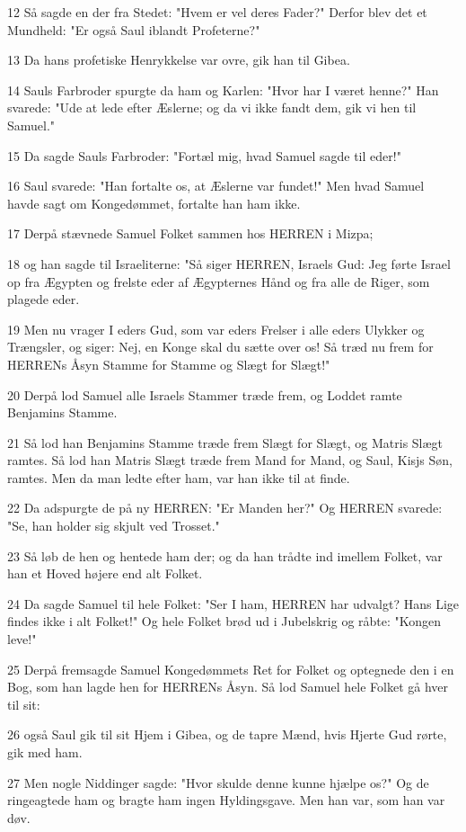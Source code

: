 \par 12 Så sagde en der fra Stedet: "Hvem er vel deres Fader?" Derfor blev det et Mundheld: "Er også Saul iblandt Profeterne?"
\par 13 Da hans profetiske Henrykkelse var ovre, gik han til Gibea.
\par 14 Sauls Farbroder spurgte da ham og Karlen: "Hvor har I været henne?" Han svarede: "Ude at lede efter Æslerne; og da vi ikke fandt dem, gik vi hen til Samuel."
\par 15 Da sagde Sauls Farbroder: "Fortæl mig, hvad Samuel sagde til eder!"
\par 16 Saul svarede: "Han fortalte os, at Æslerne var fundet!" Men hvad Samuel havde sagt om Kongedømmet, fortalte han ham ikke.
\par 17 Derpå stævnede Samuel Folket sammen hos HERREN i Mizpa;
\par 18 og han sagde til Israeliterne: "Så siger HERREN, Israels Gud: Jeg førte Israel op fra Ægypten og frelste eder af Ægypternes Hånd og fra alle de Riger, som plagede eder.
\par 19 Men nu vrager I eders Gud, som var eders Frelser i alle eders Ulykker og Trængsler, og siger: Nej, en Konge skal du sætte over os! Så træd nu frem for HERRENs Åsyn Stamme for Stamme og Slægt for Slægt!"
\par 20 Derpå lod Samuel alle Israels Stammer træde frem, og Loddet ramte Benjamins Stamme.
\par 21 Så lod han Benjamins Stamme træde frem Slægt for Slægt, og Matris Slægt ramtes. Så lod han Matris Slægt træde frem Mand for Mand, og Saul, Kisjs Søn, ramtes. Men da man ledte efter ham, var han ikke til at finde.
\par 22 Da adspurgte de på ny HERREN: "Er Manden her?" Og HERREN svarede: "Se, han holder sig skjult ved Trosset."
\par 23 Så løb de hen og hentede ham der; og da han trådte ind imellem Folket, var han et Hoved højere end alt Folket.
\par 24 Da sagde Samuel til hele Folket: "Ser I ham, HERREN har udvalgt? Hans Lige findes ikke i alt Folket!" Og hele Folket brød ud i Jubelskrig og råbte: "Kongen leve!"
\par 25 Derpå fremsagde Samuel Kongedømmets Ret for Folket og optegnede den i en Bog, som han lagde hen for HERRENs Åsyn. Så lod Samuel hele Folket gå hver til sit:
\par 26 også Saul gik til sit Hjem i Gibea, og de tapre Mænd, hvis Hjerte Gud rørte, gik med ham.
\par 27 Men nogle Niddinger sagde: "Hvor skulde denne kunne hjælpe os?" Og de ringeagtede ham og bragte ham ingen Hyldingsgave. Men han var, som han var døv.

